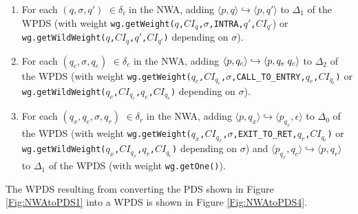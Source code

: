 \documentclass{llncs}
\begin{document}
\begin{enumerate}

\item For each $(q,\sigma,q')$ $\in \delta_i$ in the NWA, adding $\langle p,q \rangle \hookrightarrow \langle p,q' \rangle$ to $\Delta_1$ of the WPDS (with weight \texttt{wg.getWeight($q$,$CI_q$,$\sigma$,INTRA,$q'$,$CI_{q'}$}) or \texttt{wg.getWildWeight($q$,$CI_q$,$q'$,$CI_{q'}$)} depending on $\sigma$).

\item For each $(q_c,\sigma, q_e)$ $\in \delta_c$ in the NWA, adding $\langle p,q_c \rangle \hookrightarrow \langle p, q_e \hspace{.1cm} q_c \rangle$ to $\Delta_2$ of the WPDS (with weight \texttt{wg.getWeight($q_c$,$CI_{q_c}$,$\sigma$,CALL\_TO\_ENTRY,$q_e$,$CI_{q_e}$)} or \texttt{wg.getWildWeight($q_c$,$CI_{q_c}$,$q_e$,$CI_{q_e}$)} depending on $\sigma$).

\item For each $(q_x,q_c,\sigma,q_r)$ $\in \delta_r$ in the NWA, adding $\langle p,q_x \rangle \hookrightarrow \langle p_{q_x},\epsilon \rangle$ to $\Delta_0$ of the WPDS (with weight \texttt{wg.getWeight($q_x$,$CI_{q_x}$,$\sigma$,EXIT\_TO\_RET,$q_r$,$CI_{q_r}$)} or \texttt{wg.getWildWeight($q_x$,$CI_{q_x}$,$q_r$,$CI_{q_r}$)} depending on $\sigma$) and $\langle p_{q_x},q_c \rangle \hookrightarrow \langle p,q_r \rangle$ to $\Delta_1$ of the WPDS (with weight \texttt{wg.getOne()}).

\end{enumerate}

\noindent The WPDS resulting from converting the PDS shown in Figure \ref{Fig:NWAtoPDS1} into a WPDS is shown in Figure \ref{Fig:NWAtoPDS4}. \\
\end{document}
